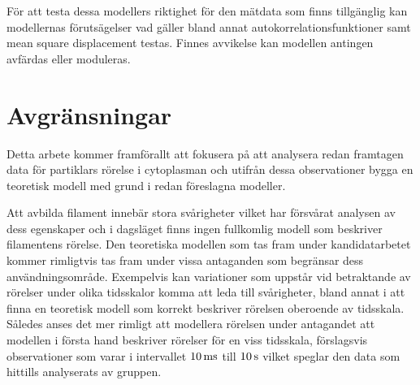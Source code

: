 För att testa dessa modellers riktighet för den mätdata som finns tillgänglig kan modellernas förutsägelser vad gäller bland annat autokorrelationsfunktioner samt mean square displacement testas. Finnes avvikelse kan modellen antingen avfärdas eller moduleras.
  
  


\section{Avgränsningar}

Detta arbete kommer framförallt att fokusera på att analysera redan framtagen data för partiklars rörelse i cytoplasman och utifrån dessa observationer bygga en teoretisk modell med grund i redan föreslagna modeller. 

Att avbilda filament innebär stora svårigheter vilket har försvårat analysen av dess egenskaper och i dagsläget finns ingen fullkomlig modell som beskriver filamentens rörelse. Den teoretiska modellen som tas fram under kandidatarbetet kommer rimligtvis tas fram under vissa antaganden som begränsar dess användningsområde. Exempelvis kan variationer som uppstår vid betraktande av rörelser under olika tidsskalor komma att leda till svårigheter, bland annat i att finna en teoretisk modell som korrekt beskriver rörelsen oberoende av tidsskala. Således anses det mer rimligt att modellera rörelsen under antagandet att modellen i första hand beskriver rörelser för en viss tidsskala, förslagsvis observationer som varar i intervallet $\unit[10]{ms}$ till $\unit[10]{s}$ vilket speglar den data som hittills analyserats av gruppen.

